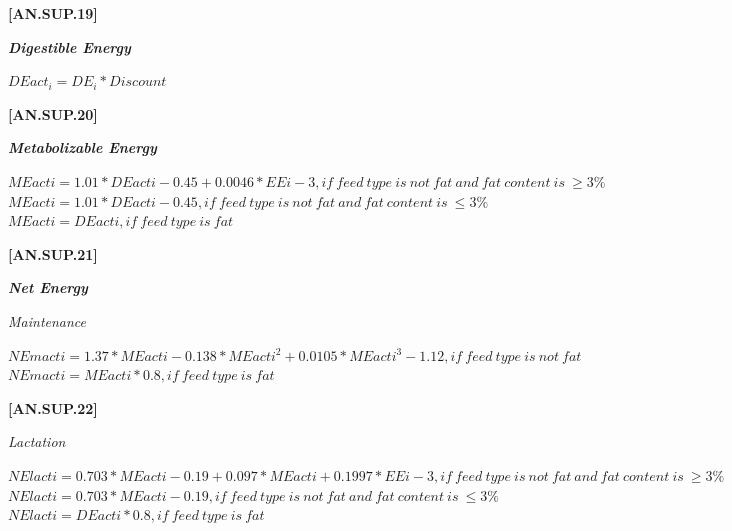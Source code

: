 \documentclass{article}
\begin{document}
\begin{refsection}
            {\raggedleft \textbf{[AN.SUP.19]}\par}
            \vspace{0.5cm}

    \textbf{\textit{Digestible Energy}} 
    \vspace{0.25cm}

    \begin{center}
    \(DEact_{i} = DE_{i} * Discount\)
    \end{center}
    \vspace{0.5cm}
    
            {\raggedleft \textbf{[AN.SUP.20]}\par}
            \vspace{0.5cm}

    \textbf{\textit{Metabolizable Energy}} 
    \vspace{0.25cm}

    \begin{center}
    \(MEacti = 1.01 * DEacti - 0.45 + 0.0046 * EEi - 3, if\ feed\ type\ is\ not\ fat\ and\ fat\ content\ is\ \geq 3\% \)
    \(MEacti = 1.01 * DEacti - 0.45 , if\ feed\ type\ is\ not\ fat\ and\ fat\ content\ is\ \leq 3\% \)
    \(MEacti = DEacti , if\ feed\ type\ is\ fat \)
    \end{center}
    \vspace{0.5cm}
    
            {\raggedleft \textbf{[AN.SUP.21]}\par}
            \vspace{0.5cm}

    \textbf{\textit{Net Energy}} 
    \vspace{0.25cm}

\textit{Maintenance}
    \begin{center}
    \(NEmacti = 1.37 * MEacti - 0.138 * MEacti^{2} + 0.0105 * MEacti^{3} - 1.12, if\ feed\ type\ is\ not\ fat \)
    \(NEmacti = MEacti * 0.8, if\ feed\ type\ is\ fat \)
    \end{center}
    \vspace{0.5cm}
    
            {\raggedleft \textbf{[AN.SUP.22]}\par}
            \vspace{0.5cm}

\textit{Lactation}
    \begin{center}
    \(NElacti = 0.703 * MEacti - 0.19 + 0.097 * MEacti + 0.1997 * EEi - 3, if\ feed\ type\ is\ not\ fat\ and\ fat\ content\ is\ \geq 3\% \)
    \(NElacti = 0.703 * MEacti - 0.19, if\ feed\ type\ is\ not\ fat\ and\ fat\ content\ is\ \leq 3\% \)
    \(NElacti = DEacti * 0.8, if\ feed\ type\ is\ fat \)
    \end{center}
    \vspace{0.5cm}
    

\end{refsection}
\end{document}
